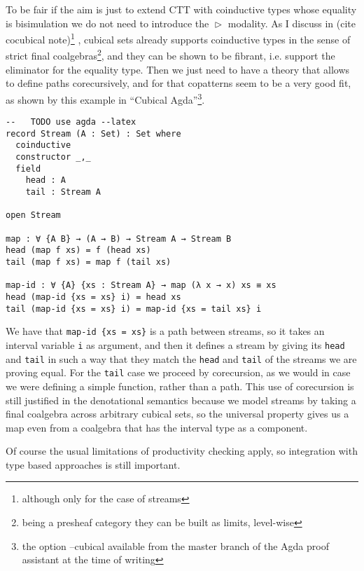 \documentclass{book}
\DeclareMathOperator{\Later}{\vartriangleright}
\begin{document}
  To be fair if the aim is just to extend CTT with coinductive types
  whose equality is bisimulation we do not need to introduce the
  $\Later$ modality. As I discuss in (cite cocubical
  note)\footnote{although only for the case of streams} , cubical sets
  already supports coinductive types in the sense of strict final
  coalgebras\footnote{being a presheaf category they can be built as
    limits, level-wise}, and they can be shown to be fibrant,
  i.e. support the eliminator for the equality type.  Then we just
  need to have a theory that allows to define paths corecursively, and
  for that copatterns seem to be a very good fit, as shown by this
  example in ``Cubical Agda''\footnote{the option --cubical available from the master branch of the Agda proof assistant at the time of writing}.
\begin{verbatim}
--   TODO use agda --latex
record Stream (A : Set) : Set where
  coinductive
  constructor _,_
  field
    head : A
    tail : Stream A

open Stream

map : ∀ {A B} → (A → B) → Stream A → Stream B
head (map f xs) = f (head xs)
tail (map f xs) = map f (tail xs)

map-id : ∀ {A} {xs : Stream A} → map (λ x → x) xs ≡ xs
head (map-id {xs = xs} i) = head xs
tail (map-id {xs = xs} i) = map-id {xs = tail xs} i
\end{verbatim}
  We have that \verb|map-id {xs = xs}| is a path between streams, so it
  takes an interval variable \verb|i| as argument, and then it defines a
  stream by giving its \verb|head| and \verb|tail| in such a way that they match
  the \verb|head| and \verb|tail| of the streams we are proving equal.  For the
  \verb|tail| case we proceed by corecursion, as we would in case we were
  defining a simple function, rather than a path.  This use of
  corecursion is still justified in the denotational semantics because
  we model streams by taking a final coalgebra across arbitrary
  cubical sets, so the universal property gives us a map even from a coalgebra that
  has the interval type as a component.

  Of course the usual limitations of productivity checking apply, so
  integration with type based approaches is still important.

\end{document}
